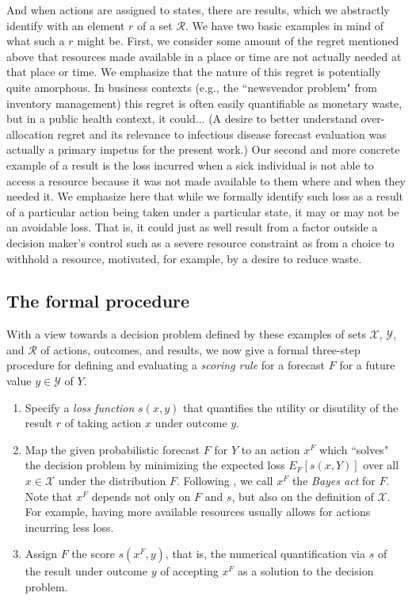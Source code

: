 \documentclass{article}
\begin{document}
And when actions are assigned to states, there are results, which we abstractly identify with an element $r$ of a set $\mathcal{R}$. We have two basic examples in mind of what such a $r$ might be.   First, we consider some amount of the regret mentioned above that resources made available in a place or time are not actually needed at that place or time. We emphasize that the nature of this regret is potentially quite amorphous.  In business contexts (e.g., the ``newsvendor problem" from inventory management) this regret is often easily quantifiable as monetary waste, but in a public health context, it could... (A desire to better understand over-allocation regret and its relevance to infectious disease forecast evaluation was actually a primary impetus for the present work.) 
Our second and more concrete example of a result is the loss incurred when a sick individual is not able to access a resource because it was not made available to them where and when they needed it.   We emphasize here that while we formally identify such loss as a result of a particular action being taken under a particular state, it may or may not be an avoidable loss.  That is, it could just as well result from a factor outside a decision maker's control such as a severe resource constraint as from a choice to withhold a resource, motivated, for example, by a desire to reduce waste.

\subsection{The formal procedure}

With a view towards a decision problem defined by these examples of sets $\mathcal{X}$, $\mathcal{Y}$, and $\mathcal{R}$ of actions, outcomes, and results, we now give a formal three-step procedure for defining and evaluating a \emph{scoring rule} for a forecast $F$ for a future value $y \in \mathcal{Y}$ of $Y$.

\begin{enumerate}
\item Specify a \emph{loss function} $s(x,y)$ that quantifies the utility or disutility of the result $r$ of taking action $x$ under outcome $y$.
\item Map the given probabilistic forecast $F$ for $Y$ to an action $x^F$ which ``solves" the decision problem by minimizing the expected loss $E_F\left[s(x,Y)\right]$ over all $x \in \mathcal{X}$ under the distribution $F$.  Following \cite{dawid2007geometry}, we call $x^F$ the \emph{Bayes act} for $F$. Note that $x^F$ depends not only on $F$ and $s$, but also on the definition of $\mathcal{X}$. For example, having more available resources usually allows for actions incurring less loss.   
\item Assign $F$ the score $s(x^F,y)$, that is, the numerical quantification via $s$ of the result under outcome $y$ of accepting $x^F$ as a solution to the decision problem.
\end{enumerate}{}
\end{document}
